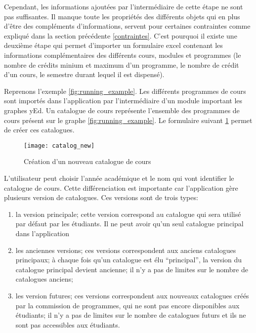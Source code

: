 Cependant, les informations ajoutées par l'intermédiaire de cette étape ne sont pas suffisantes. Il manque toute les propriétés des différents objets qui en plus d'être des compléments d'informations, servent pour certaines contraintes comme expliqué dans la section précédente \ref{contraintes}. C'est pourquoi il existe une deuxième étape qui permet d'importer un formulaire excel contenant les informations complémentaires des différents cours, modules et programmes (le nombre de crédits minium et maximum d'un programme, le nombre de crédit d'un cours, le semestre durant lequel il est dispensé). 


Reprenons  l'exemple \ref{fig:running_example}. Les différents programmes de cours sont importés dans l'application par l'intermédiaire d'un module important les graphes yEd. Un catalogue de cours représente l'ensemble des programmes de cours présent sur le graphe \ref{fig:running_example}. Le formulaire suivant \ref{fig:catalog_new_page} permet de créer ces catalogues. 

\begin{figure}
\centering
\caption{Création d'un nouveau catalogue de cours}
\label{fig:catalog_new_page}
\texttt{[image: catalog\_new]}
\end{figure}


L'utilisateur peut choisir l'année académique et le nom qui vont identifier le catalogue de cours. Cette différenciation est importante car l'application gère plusieurs version de catalogues. Ces versions sont de trois types: 

\begin{enumerate}
\item la version principale; cette version correspond au catalogue qui sera utilisé par défaut par les étudiants. Il ne peut avoir qu'un seul catalogue principal dans l'application
\item les anciennes versions; ces versions correspondent aux anciens catalogues principaux; à chaque fois qu'un catalogue est élu ``principal'', la version du catalogue principal devient ancienne; il n'y a pas de limites sur le nombre de catalogues anciens;
\item les version futures; ces versions correspondent aux nouveaux catalogues créés par la commission de programmes, qui ne sont pas encore disponibles aux étudiants; il n'y a pas de limites sur le nombre de catalogues futurs et ils ne sont pas accessibles aux étudiants. 
\end{enumerate}

